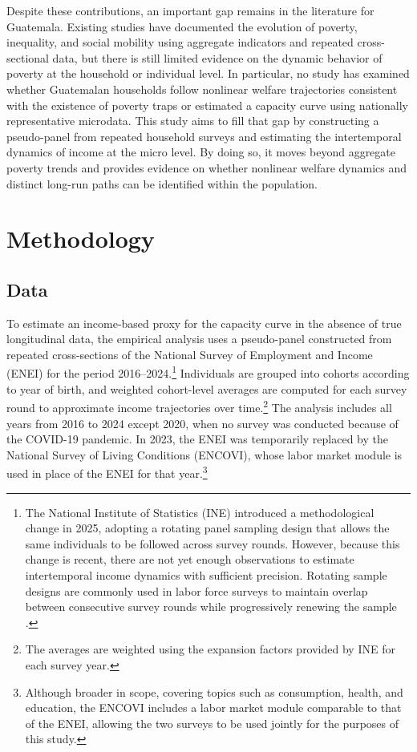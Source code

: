 \documentclass{article}
\begin{document}
Despite these contributions, an important gap remains in the literature for Guatemala. Existing studies have documented the evolution of poverty, inequality, and social mobility using aggregate indicators and repeated cross-sectional data, but there is still limited evidence on the dynamic behavior of poverty at the household or individual level. In particular, no study has examined whether Guatemalan households follow nonlinear welfare trajectories consistent with the existence of poverty traps or estimated a capacity curve using nationally representative microdata. This study aims to fill that gap by constructing a pseudo-panel from repeated household surveys and estimating the intertemporal dynamics of income at the micro level. By doing so, it moves beyond aggregate poverty trends and provides evidence on whether nonlinear welfare dynamics and distinct long-run paths can be identified within the population.

\section{Methodology}

\subsection{Data}

To estimate an income-based proxy for the capacity curve in the absence of true longitudinal data, the empirical analysis uses a pseudo-panel constructed from repeated cross-sections of the National Survey of Employment and Income (ENEI) for the period 2016--2024.\footnote{The National Institute of Statistics (INE) introduced a methodological change in 2025, adopting a rotating panel sampling design that allows the same individuals to be followed across survey rounds. However, because this change is recent, there are not yet enough observations to estimate intertemporal income dynamics with sufficient precision. Rotating sample designs are commonly used in labor force surveys to maintain overlap between consecutive survey rounds while progressively renewing the sample \parencite{ilo2014sampling}.} Individuals are grouped into cohorts according to year of birth, and weighted cohort-level averages  are computed for each survey round to approximate income trajectories over time.\footnote{The averages are weighted using the expansion factors provided by INE for each survey year.} The analysis includes all years from 2016 to 2024 except 2020, when no survey was conducted because of the COVID-19 pandemic. In 2023, the ENEI was temporarily replaced by the National Survey of Living Conditions (ENCOVI), whose labor market module is used in place of the ENEI for that year.\footnote{Although broader in scope, covering topics such as consumption, health, and education, the ENCOVI includes a labor market module comparable to that of the ENEI, allowing the two surveys to be used jointly for the purposes of this study.}
\end{document}

